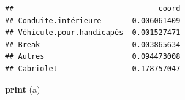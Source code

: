 \documentclass[]{book}
\newenvironment{Shaded}{\begin{snugshade}}{\end{snugshade}}
\newcommand{\DataTypeTok}[1]{\textcolor[rgb]{0.13,0.29,0.53}{#1}}
\newcommand{\KeywordTok}[1]{\textcolor[rgb]{0.13,0.29,0.53}{\textbf{#1}}}
\newcommand{\NormalTok}[1]{#1}
\newcommand{\OperatorTok}[1]{\textcolor[rgb]{0.81,0.36,0.00}{\textbf{#1}}}
\newcommand{\StringTok}[1]{\textcolor[rgb]{0.31,0.60,0.02}{#1}}
\begin{document}
\begin{Shaded}
\end{Shaded}

\begin{verbatim}
##                                 coord
## Conduite.intérieure      -0.006061409
## Véhicule.pour.handicapés  0.001527471
## Break                     0.003865634
## Autres                    0.094473008
## Cabriolet                 0.178757047
\end{verbatim}

\begin{Shaded}
\begin{Highlighting}[]
\KeywordTok{print}\NormalTok{ (a)}
\end{Highlighting}
\end{Shaded}
\end{document}
